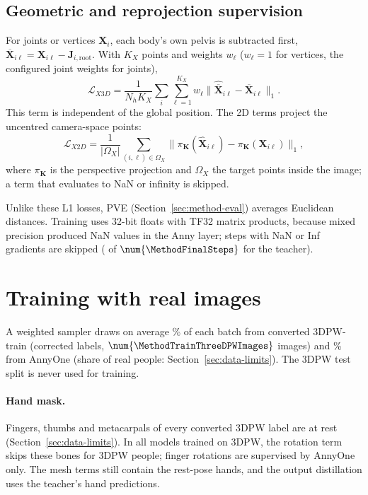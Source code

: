 \subsection{Geometric and reprojection supervision}

For joints or vertices $\mathbf X_i$, each body's own pelvis is subtracted first,
$\overline{\mathbf X}_{i\ell}=\mathbf X_{i\ell}-\mathbf J_{i,\mathrm{root}}$. With $K_X$ points and weights $w_\ell$
($w_\ell=1$ for vertices, the configured joint weights for joints),
\begin{equation}
 \mathcal L_{X3D}=\frac{1}{N_hK_X}\sum_i\sum_{\ell=1}^{K_X}
 w_\ell\|\widehat{\overline{\mathbf X}}_{i\ell}-\overline{\mathbf X}_{i\ell}\|_1 .
\label{eq:loss-geometry}
\end{equation}
This term is independent of the global position. The 2D terms project the uncentred camera-space points:
\begin{equation}
 \mathcal L_{X2D}=\frac{1}{|\Omega_X|}
 \sum_{(i,\ell)\in\Omega_X}
 \|\pi_{\mathbf K}(\widehat{\mathbf X}_{i\ell})-\pi_{\mathbf K}(\mathbf X_{i\ell})\|_1 ,
\label{eq:loss-reprojection}
\end{equation}
where $\pi_{\mathbf K}$ is the perspective projection and $\Omega_X$ the target points inside the image; a term that evaluates to NaN or infinity is skipped.

Unlike these L1 losses, PVE (Section~\ref{sec:method-eval}) averages Euclidean distances. Training uses 32-bit floats
with TF32 matrix products, because mixed precision produced NaN values in the Anny layer; steps with NaN or Inf gradients are skipped (\MethodFinalNaNSteps{} of
$\num{\MethodFinalSteps}$ for the teacher).

\section{Training with real images}
\label{sec:method-real}

A weighted sampler draws on average \MethodMixRatio\% of each batch from converted 3DPW-train (corrected labels,
$\num{\MethodTrainThreeDPWImages}$ images) and \MethodSynthRatio\% from AnnyOne (share of real people:
Section~\ref{sec:data-limits}). The 3DPW test split is never used
for training.

\paragraph{Hand mask.} Fingers, thumbs and metacarpals of every converted 3DPW label are at rest
(Section~\ref{sec:data-limits}). In all models trained on 3DPW, the rotation term skips these
\MethodHandMaskBones{} bones for 3DPW people; finger rotations are supervised by AnnyOne only. The mesh terms still contain the rest-pose hands, and the output distillation uses the teacher's hand
predictions.

